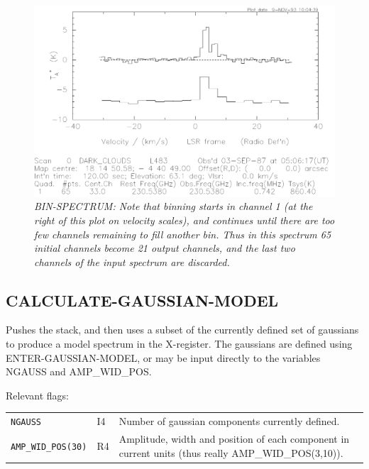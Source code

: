 \documentclass[11pt,twoside]{report}
\begin{document}
\begin{figure}[htbp]
\begin{center}
\includegraphics[scale=0.65]{bin-spec}
\protect\parbox{5.5in}
{\caption[BIN]
{\sl
BIN-SPECTRUM: Note that binning starts in channel 1 (at the right of this
plot on velocity scales), and continues until there are too few channels
remaining to fill another bin. Thus in this spectrum 65 initial channels
become 21 output channels, and the last two channels of the input spectrum
are discarded.
\label{BIN}
}
}
\end{center}
\end{figure}

\subsection{CALCULATE-GAUSSIAN-MODEL} 

Pushes the stack, and then uses a subset of the currently defined set of
gaussians to produce a model spectrum in the X-register. The gaussians
are defined using ENTER-GAUSSIAN-MODEL, or may be input directly to the
variables NGAUSS and AMP\_WID\_POS.

Relevant flags:\\
\begin{tabular}{lll}
  \verb+NGAUSS+          & I4 & Number of gaussian components currently
                                defined. \\
  \verb+AMP_WID_POS(30)+ & R4 & \parbox[t]{4in}
                                {Amplitude, width and position of each
                                component in current units (thus really
                                AMP\_WID\_POS(3,10)).}
\end{tabular}
\end{document}
